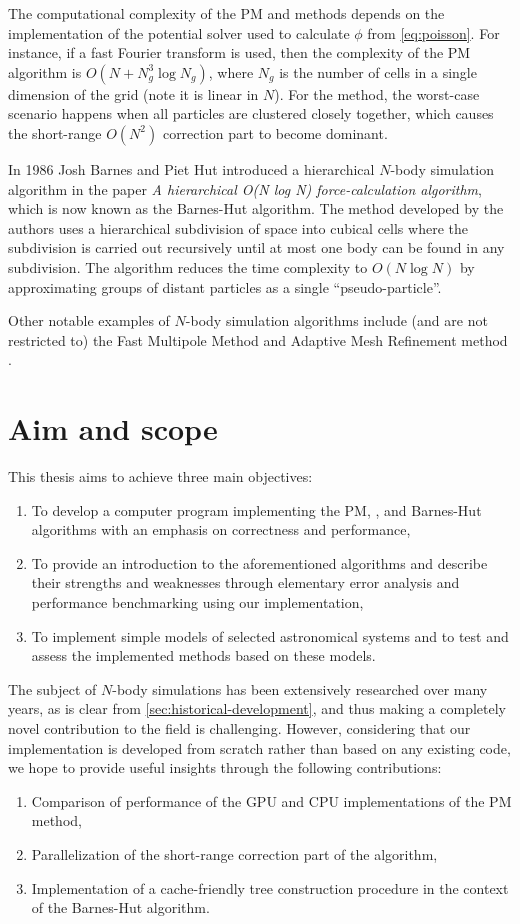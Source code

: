 The computational complexity of the PM and \PThreeM{} methods depends on the implementation of the potential solver used to calculate $\phi$ from \autoref{eq:poisson}.
For instance, if a fast Fourier transform is used, then the complexity of the PM algorithm is $O(N + N_g^3\log N_g)$, where $N_g$ is the number of cells in a single dimension of the grid (note it is linear in $N$).
For the \PThreeM{} method, the worst-case scenario happens when all particles are clustered closely together, which causes the short-range $O(N^2)$ correction part to become dominant.

In 1986 Josh Barnes and Piet Hut introduced a hierarchical $N$-body simulation algorithm in the paper \textit{A hierarchical O(N log N) force-calculation algorithm}, which is now known as the Barnes-Hut algorithm.
The method developed by the authors uses a hierarchical subdivision of space into cubical cells where the subdivision is carried out recursively until at most one body can be found in any subdivision.
The algorithm reduces the time complexity to $O(N \log N)$ by approximating groups of distant particles as a single ``pseudo-particle''.

Other notable examples of $N$-body simulation algorithms include (and are not restricted to) the Fast Multipole Method and Adaptive Mesh Refinement method \cite{trenti2008nbody}.

\section{Aim and scope}
This thesis aims to achieve three main objectives:
\begin{enumerate}
    \item To develop a computer program implementing the PM, \PThreeM{}, and Barnes-Hut algorithms with an emphasis on correctness and performance,
    \item To provide an introduction to the aforementioned algorithms and describe their strengths and weaknesses through elementary error analysis and performance benchmarking using our implementation,
    \item To implement simple models of selected astronomical systems and to test and assess the implemented methods based on these models.
\end{enumerate}
The subject of $N$-body simulations has been extensively researched over many years, as is clear from \autoref{sec:historical-development}, and thus making a completely novel contribution to the field is challenging.
However, considering that our implementation is developed from scratch rather than based on any existing code, we hope to provide useful insights through the following contributions:
\begin{enumerate}
    \item Comparison of performance of the GPU and CPU implementations of the PM method,
    \item Parallelization of the short-range correction part of the \PThreeM{} algorithm,
    \item Implementation of a cache-friendly tree construction procedure in the context of the Barnes-Hut algorithm.
\end{enumerate}
